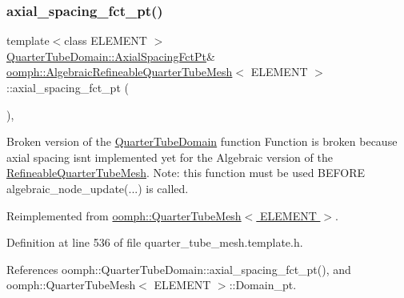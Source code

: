 \subsubsection{\texorpdfstring{axial\+\_\+spacing\+\_\+fct\+\_\+pt()}{axial\_spacing\_fct\_pt()}}
{\footnotesize\ttfamily template$<$class E\+L\+E\+M\+E\+NT $>$ \\
\hyperlink{classoomph_1_1QuarterTubeDomain_ae347af42a5dcb9b3b82c2247975b01db}{Quarter\+Tube\+Domain\+::\+Axial\+Spacing\+Fct\+Pt}\& \hyperlink{classoomph_1_1AlgebraicRefineableQuarterTubeMesh}{oomph\+::\+Algebraic\+Refineable\+Quarter\+Tube\+Mesh}$<$ E\+L\+E\+M\+E\+NT $>$\+::axial\+\_\+spacing\+\_\+fct\+\_\+pt (\begin{DoxyParamCaption}{ }\end{DoxyParamCaption})\hspace{0.3cm}{\ttfamily [inline]}, {\ttfamily [virtual]}}



Broken version of the \hyperlink{classoomph_1_1QuarterTubeDomain}{Quarter\+Tube\+Domain} function Function is broken because axial spacing isn\textquotesingle{}t implemented yet for the Algebraic version of the \hyperlink{classoomph_1_1RefineableQuarterTubeMesh}{Refineable\+Quarter\+Tube\+Mesh}. Note\+: this function must be used B\+E\+F\+O\+RE algebraic\+\_\+node\+\_\+update(...) is called. 



Reimplemented from \hyperlink{classoomph_1_1QuarterTubeMesh_a5c880d6214a07676a533227f813634d8}{oomph\+::\+Quarter\+Tube\+Mesh$<$ E\+L\+E\+M\+E\+N\+T $>$}.



Definition at line 536 of file quarter\+\_\+tube\+\_\+mesh.\+template.\+h.



References oomph\+::\+Quarter\+Tube\+Domain\+::axial\+\_\+spacing\+\_\+fct\+\_\+pt(), and oomph\+::\+Quarter\+Tube\+Mesh$<$ E\+L\+E\+M\+E\+N\+T $>$\+::\+Domain\+\_\+pt.

\mbox{\label{classoomph_1_1AlgebraicRefineableQuarterTubeMesh_af521c0a76cf0bd14692979bd7747507d}} 
